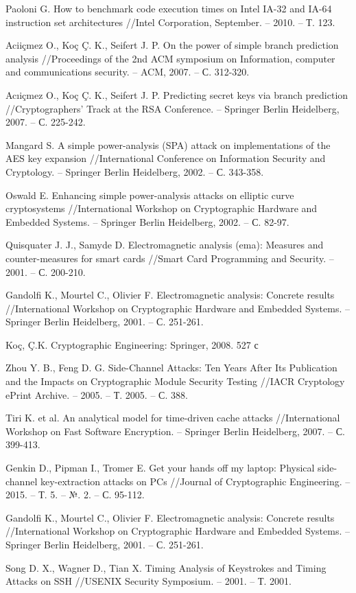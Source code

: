 \begin{thebibliography}{00}
  Paoloni G. How to benchmark code execution times on Intel IA-32 and IA-64 instruction set architectures //Intel Corporation, September. – 2010. – Т. 123.

  Aciiçmez O., Koç Ç. K., Seifert J. P. On the power of simple branch prediction analysis //Proceedings of the 2nd ACM symposium on Information, computer and communications security. – ACM, 2007. – С. 312-320.

  Acıiçmez O., Koç Ç. K., Seifert J. P. Predicting secret keys via branch prediction //Cryptographers’ Track at the RSA Conference. – Springer Berlin Heidelberg, 2007. – С. 225-242.

  Mangard S. A simple power-analysis (SPA) attack on implementations of the AES key expansion //International Conference on Information Security and Cryptology. – Springer Berlin Heidelberg, 2002. – С. 343-358.

  Oswald E. Enhancing simple power-analysis attacks on elliptic curve cryptosystems //International Workshop on Cryptographic Hardware and Embedded Systems. – Springer Berlin Heidelberg, 2002. – С. 82-97.

  Quisquater J. J., Samyde D. Electromagnetic analysis (ema): Measures and counter-measures for smart cards //Smart Card Programming and Security. – 2001. – С. 200-210.

  Gandolfi K., Mourtel C., Olivier F. Electromagnetic analysis: Concrete results //International Workshop on Cryptographic Hardware and Embedded Systems. – Springer Berlin Heidelberg, 2001. – С. 251-261.

  Ko{\c{c}}, \c{C}.K. Cryptographic Engineering: Springer, 2008. 527 с

  Zhou Y. B., Feng D. G. Side-Channel Attacks: Ten Years After Its Publication and the Impacts on Cryptographic Module Security Testing //IACR Cryptology ePrint Archive. – 2005. – Т. 2005. – С. 388.

  Tiri K. et al. An analytical model for time-driven cache attacks //International Workshop on Fast Software Encryption. – Springer Berlin Heidelberg, 2007. – С. 399-413.

  Genkin D., Pipman I., Tromer E. Get your hands off my laptop: Physical side-channel key-extraction attacks on PCs //Journal of Cryptographic Engineering. – 2015. – Т. 5. – №. 2. – С. 95-112. 

  Gandolfi K., Mourtel C., Olivier F. Electromagnetic analysis: Concrete results //International Workshop on Cryptographic Hardware and Embedded Systems. – Springer Berlin Heidelberg, 2001. – С. 251-261.

  Song D. X., Wagner D., Tian X. Timing Analysis of Keystrokes and Timing Attacks on SSH //USENIX Security Symposium. – 2001. – Т. 2001. 

\end{thebibliography}
\endgroup

\clearpage
